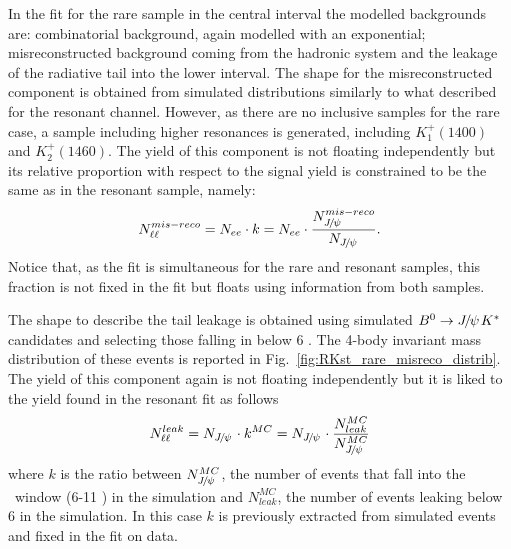 In the fit for the rare sample in the central \qsq interval the modelled
backgrounds are: combinatorial background, again modelled with an exponential; misreconstructed background
coming from the hadronic system and the leakage of the \jpsi radiative tail into the lower \qsq interval.
The shape for the misreconstructed component is obtained from simulated distributions similarly to what described
for the resonant channel. However, as there are no inclusive samples for the rare case,
a sample including higher \Kstar resonances is generated, including $K_1^+(1400)$ and $K_2^+(1460)$.
The yield of this component is not floating independently but its relative proportion
with respect to the signal yield is constrained to be the same as in the resonant sample, namely:
\begin{equation}
N_{\ell\ell}^{mis-reco} = N_{ee} \cdot k = N_{ee} \cdot \frac{N_{\jpsi}^{mis-reco}}{N_{\jpsi}}.
\end{equation}
Notice that, as the fit is simultaneous for the rare and resonant samples, this fraction
is not fixed in the fit but floats using information from both samples.

The shape to describe the \jpsi tail leakage is obtained using simulated $\Bz\to\jpsi\Kstar$ candidates
and selecting those falling in \qsq below 6 \gevgevcccc. The 4-body invariant mass distribution
of these events is reported in Fig.~\ref{fig:RKst_rare_misreco_distrib}. The yield of this component
again is not floating independently but it is liked to the yield found in the resonant fit as follows
\begin{equation}
N_{\ell\ell}^{leak} = N_{\jpsi} \cdot k^{MC} = N_{\jpsi} \cdot \frac{N_{leak}^{MC}}{N_{\jpsi}^{MC}}
\end{equation}
where $k$ is the ratio between $N_{\jpsi}^{MC}$, the number of \jpsi events
that fall into the \jpsi ~\qsq window (6-11 \gevgevcccc) in the simulation
and $N_{leak}^{MC}$, the number of \jpsi events leaking below 6 \gevgevcccc in the simulation.
In this case $k$ is previously extracted from simulated events and fixed in the fit on data.

